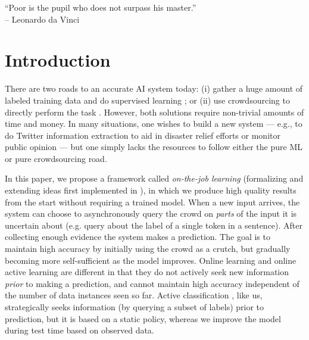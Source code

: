 \begin{epigraph}
``Poor is the pupil who does not surpass his master.''\\
-- Leonardo da Vinci
\end{epigraph}

\section{Introduction}
\label{sec:intro}

There are two roads to an accurate AI system today:
(i) gather a huge amount of labeled training data \citep{deng2009imagenet} and do supervised learning \citep{krizhevsky2012imagenet};
or (ii) use crowdsourcing to directly perform the task \citep{bernstein2010soylent,kokkalis2013emailvalet}.
However, both solutions require non-trivial amounts of time and money.
In many situations, one wishes to build a new system --- e.g., to do Twitter information extraction
\citep{li2012twiner} to aid in disaster relief efforts or monitor public
opinion --- but one simply lacks the resources to follow either the pure ML or pure crowdsourcing road.

In this paper, we propose a framework called \emph{on-the-job learning} (formalizing and extending ideas first implemented in \citep{lasecki2013real}),
in which we produce high quality results from the start without requiring a trained model.
When a new input arrives,
the system can choose to asynchronously query the crowd on \emph{parts} of the input it is
uncertain about (e.g. query about the label of a single token in a sentence). After collecting enough evidence the system makes a prediction.
The goal is to maintain high accuracy by initially using the crowd as a crutch,
but gradually becoming more self-sufficient as the model improves.
Online learning \citep{cesabianchi06prediction} and
online active learning \citep{helmbold1997some,sculley2007online,chu2011unbiased}
are different in that
they do not actively seek new information \emph{prior} to making a prediction,
and cannot maintain high accuracy independent of the number of data instances seen so far.
Active classification \citep{gao2011active}, like us,
strategically seeks information (by querying a subset of labels) prior to prediction,
but it is based on a static policy, 
whereas we improve the model during test time based on observed data.

